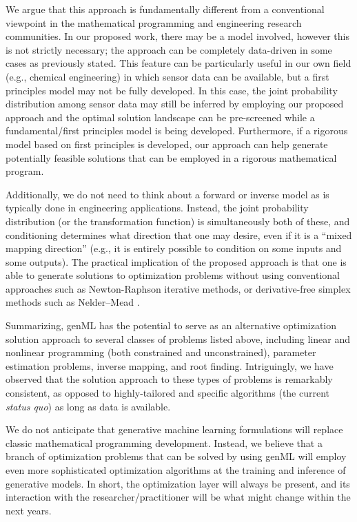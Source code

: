 \documentclass{achemso}
\begin{document}
We argue that this approach is fundamentally different from a conventional viewpoint in the mathematical programming and engineering research communities. In our proposed work, there may be a model involved, however this is not strictly necessary; the approach can be completely data-driven in some cases as previously stated. This feature can be particularly useful in our own field (e.g., chemical engineering) in which sensor data can be available, but a first principles model may not be fully developed. In this case, the joint probability distribution among sensor data may still be inferred by employing our proposed approach and the optimal solution landscape can be pre-screened while a fundamental/first principles model is being developed. Furthermore, if a rigorous model based on first principles is developed, our approach can help generate potentially feasible solutions that can be employed in a rigorous mathematical program. 

Additionally, we do not need to think about a forward or inverse model as is typically done in engineering applications. Instead, the joint probability distribution (or the transformation function) is simultaneously both of these, and conditioning determines what direction that one may desire, even if it is a ``mixed mapping direction'' (e.g., it is entirely possible to condition on some inputs and some outputs). The practical implication of the proposed approach is that one is able to generate solutions to optimization problems without using conventional approaches such as Newton-Raphson iterative methods, or derivative-free simplex methods such as Nelder--Mead \cite{nelder1965simplex}. 

Summarizing, genML has the potential to serve as an alternative optimization solution approach to several classes of problems listed above, including linear and nonlinear programming (both constrained and unconstrained), parameter estimation problems, inverse mapping, and root finding. Intriguingly, we have observed that the solution approach to these types of problems is remarkably consistent, as opposed to highly-tailored and specific algorithms (the current \textit{status quo}) as long as data is available. 

We do not anticipate that generative machine learning formulations will replace classic mathematical programming development. Instead, we believe that a branch of optimization problems that can be solved by using genML will employ even more sophisticated optimization algorithms at the training and inference of generative models. In short, the optimization layer will always be present, and its interaction with the researcher/practitioner will be what might change within the next years. 
\end{document}
